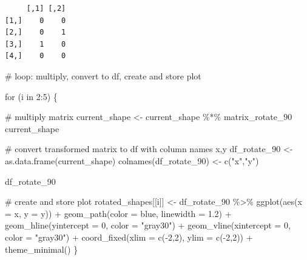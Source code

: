 \documentclass[
  letterpaper,
  DIV=11,
  numbers=noendperiod]{scrartcl}
\newenvironment{Shaded}{\begin{snugshade}}{\end{snugshade}}
\newcommand{\AttributeTok}[1]{\textcolor[rgb]{0.40,0.45,0.13}{#1}}
\newcommand{\CommentTok}[1]{\textcolor[rgb]{0.37,0.37,0.37}{#1}}
\newcommand{\ControlFlowTok}[1]{\textcolor[rgb]{0.00,0.23,0.31}{#1}}
\newcommand{\DecValTok}[1]{\textcolor[rgb]{0.68,0.00,0.00}{#1}}
\newcommand{\FloatTok}[1]{\textcolor[rgb]{0.68,0.00,0.00}{#1}}
\newcommand{\FunctionTok}[1]{\textcolor[rgb]{0.28,0.35,0.67}{#1}}
\newcommand{\NormalTok}[1]{\textcolor[rgb]{0.00,0.23,0.31}{#1}}
\newcommand{\OtherTok}[1]{\textcolor[rgb]{0.00,0.23,0.31}{#1}}
\newcommand{\SpecialCharTok}[1]{\textcolor[rgb]{0.37,0.37,0.37}{#1}}
\newcommand{\StringTok}[1]{\textcolor[rgb]{0.13,0.47,0.30}{#1}}
\begin{document}
\begin{verbatim}
     [,1] [,2]
[1,]    0    0
[2,]    0    1
[3,]    1    0
[4,]    0    0
\end{verbatim}

\begin{Shaded}
\begin{Highlighting}[]
\CommentTok{\# loop: multiply, convert to df, create and store plot}

\ControlFlowTok{for}\NormalTok{ (i }\ControlFlowTok{in} \DecValTok{2}\SpecialCharTok{:}\DecValTok{5}\NormalTok{) \{}
  
  \CommentTok{\# multiply matrix}
\NormalTok{  current\_shape }\OtherTok{\textless{}{-}}\NormalTok{ current\_shape }\SpecialCharTok{\%*\%}\NormalTok{ matrix\_rotate\_90 }
\NormalTok{  current\_shape}
  
  \CommentTok{\# convert transformed matrix to df with column names x,y}
\NormalTok{  df\_rotate\_90 }\OtherTok{\textless{}{-}} \FunctionTok{as.data.frame}\NormalTok{(current\_shape)  }
  \FunctionTok{colnames}\NormalTok{(df\_rotate\_90) }\OtherTok{\textless{}{-}} \FunctionTok{c}\NormalTok{(}\StringTok{"x"}\NormalTok{,}\StringTok{"y"}\NormalTok{)}
  
\NormalTok{  df\_rotate\_90}
  
  \CommentTok{\# create and store plot}
\NormalTok{  rotated\_shapes[[i]] }\OtherTok{\textless{}{-}}\NormalTok{ df\_rotate\_90 }\SpecialCharTok{\%\textgreater{}\%} 
    \FunctionTok{ggplot}\NormalTok{(}\FunctionTok{aes}\NormalTok{(}\AttributeTok{x =}\NormalTok{ x, }\AttributeTok{y =}\NormalTok{ y)) }\SpecialCharTok{+}
    \FunctionTok{geom\_path}\NormalTok{(}\AttributeTok{color =} \StringTok{\textquotesingle{}blue\textquotesingle{}}\NormalTok{, }\AttributeTok{linewidth =} \FloatTok{1.2}\NormalTok{) }\SpecialCharTok{+}
    \FunctionTok{geom\_hline}\NormalTok{(}\AttributeTok{yintercept =} \DecValTok{0}\NormalTok{, }\AttributeTok{color =} \StringTok{"gray30"}\NormalTok{) }\SpecialCharTok{+}
    \FunctionTok{geom\_vline}\NormalTok{(}\AttributeTok{xintercept =} \DecValTok{0}\NormalTok{, }\AttributeTok{color =} \StringTok{"gray30"}\NormalTok{) }\SpecialCharTok{+}
    \FunctionTok{coord\_fixed}\NormalTok{(}\AttributeTok{xlim =} \FunctionTok{c}\NormalTok{(}\SpecialCharTok{{-}}\DecValTok{2}\NormalTok{,}\DecValTok{2}\NormalTok{), }\AttributeTok{ylim =} \FunctionTok{c}\NormalTok{(}\SpecialCharTok{{-}}\DecValTok{2}\NormalTok{,}\DecValTok{2}\NormalTok{)) }\SpecialCharTok{+}
    \FunctionTok{theme\_minimal}\NormalTok{() }
\NormalTok{  \}}


\end{Highlighting}
\end{Shaded}
\end{document}
